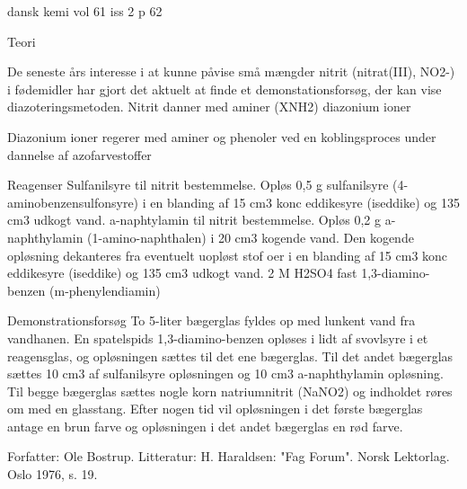  

dansk kemi vol 61 iss 2 p 62

Teori

De seneste års interesse i at kunne påvise små mængder nitrit (nitrat(III), NO2-) i fødemidler har gjort det aktuelt at finde et
demonstationsforsøg, der kan vise diazoteringsmetoden.
Nitrit danner med aminer (XNH2) diazonium ioner


Diazonium ioner regerer med aminer og phenoler ved en koblingsproces
under dannelse af azofarvestoffer

Reagenser
Sulfanilsyre til nitrit bestemmelse. Opløs 0,5 g sulfanilsyre
(4-aminobenzensulfonsyre) i en blanding af 15 cm3 konc eddikesyre
(iseddike) og 135 cm3 udkogt vand.
a-naphtylamin til nitrit bestemmelse. Opløs 0,2 g a-naphthylamin
(1-amino-naphthalen) i 20 cm3 kogende vand. Den kogende opløsning
dekanteres fra eventuelt uopløst stof oer i en blanding af 15 cm3
konc eddikesyre (iseddike) og 135 cm3 udkogt vand.
2 M H2SO4
fast 1,3-diamino-benzen (m-phenylendiamin)

Demonstrationsforsøg
To 5-liter bægerglas fyldes op med lunkent vand fra vandhanen.
En spatelspids 1,3-diamino-benzen opløses i lidt af svovlsyre i et
reagensglas, og opløsningen sættes til det ene bægerglas.
Til det andet bægerglas sættes 10 cm3 af sulfanilsyre opløsningen og
10 cm3 a-naphthylamin opløsning.
Til begge bægerglas sættes nogle korn natriumnitrit (NaNO2) og indholdet
røres om med en glasstang.
Efter nogen tid vil opløsningen i det første bægerglas antage en
brun farve og opløsningen i det andet bægerglas en rød farve.

Forfatter: Ole Bostrup.
Litteratur: H. Haraldsen: "Fag Forum". Norsk Lektorlag. Oslo 1976, s. 19.
